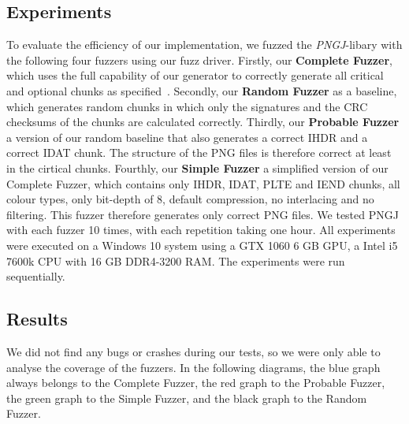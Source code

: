\documentclass[runningheads]{llncs}
\begin{document}
\subsection{Experiments}
To evaluate the efficiency of our implementation, we fuzzed the \textit{PNGJ}-libary with the following four fuzzers using our fuzz driver.\newline
Firstly, our \textbf{Complete Fuzzer}, which uses the full capability of our generator to correctly generate all critical and optional chunks as specified~\cite{libpng_chunks}.\newline
Secondly, our \textbf{Random Fuzzer} as a baseline, which generates random chunks in which only the signatures and the CRC checksums of the chunks are calculated correctly.\newline
Thirdly, our \textbf{Probable Fuzzer} a version of our random baseline that also generates a correct IHDR and a correct IDAT chunk. The structure of the PNG files is therefore correct at least in the cirtical chunks.\newline
Fourthly, our \textbf{Simple Fuzzer} a simplified version of our Complete Fuzzer, which contains only IHDR, IDAT, PLTE and IEND chunks, all colour types, only bit-depth of 8, default compression, no interlacing and no filtering. This fuzzer therefore generates only correct PNG files.\newline
We tested PNGJ with each fuzzer 10 times, with each repetition taking one hour. All experiments were executed on a Windows 10 system using a GTX 1060 6 GB GPU, a Intel i5 7600k CPU with 16 GB DDR4-3200 RAM. The experiments were run sequentially.

\subsection{Results}
We did not find any bugs or crashes during our tests, so we were only able to analyse the coverage of the fuzzers.\newline
In the following diagrams, the blue graph always belongs to the Complete Fuzzer, the red graph to the Probable Fuzzer, the green graph to the Simple Fuzzer, and the black graph to the Random Fuzzer.
\end{document}
